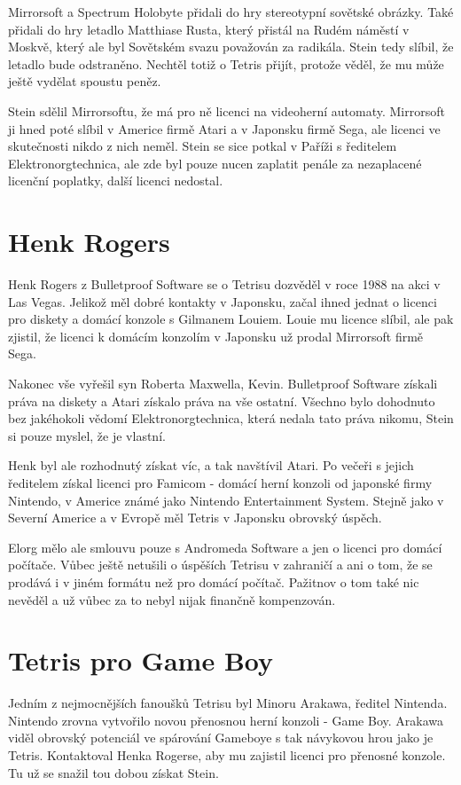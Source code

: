 \documentclass[12pt]{report}			%
\begin{document}
Mirrorsoft a Spectrum Holobyte přidali do hry stereotypní sovětské obrázky. Také přidali do hry letadlo Matthiase Rusta, který přistál na Rudém náměstí v Moskvě, který ale byl  Sovětském svazu považován za radikála. Stein tedy slíbil, že letadlo bude odstraněno. Nechtěl totiž o Tetris přijít, protože věděl, že mu může ještě vydělat spoustu peněz. \cite{Brown2016}

Stein sdělil Mirrorsoftu, že má pro ně licenci na videoherní automaty. Mirrorsoft ji hned poté slíbil v Americe firmě Atari a v Japonsku firmě Sega, ale licenci ve skutečnosti nikdo z nich neměl. Stein se sice potkal v Paříži s ředitelem Elektronorgtechnica, ale zde byl pouze nucen zaplatit penále za nezaplacené licenční poplatky, další licenci nedostal. \cite{Brown2016}\\
			
		\chapter{Henk Rogers}
Henk Rogers z Bulletproof Software se o Tetrisu dozvěděl v roce 1988 na akci v Las Vegas. Jelikož měl dobré kontakty v Japonsku, začal ihned jednat o licenci pro diskety a domácí konzole s Gilmanem Louiem. Louie mu licence slíbil, ale pak zjistil, že licenci k domácím konzolím v Japonsku už prodal Mirrorsoft firmě Sega.\cite{Brown2016}

Nakonec vše vyřešil syn Roberta Maxwella, Kevin. Bulletproof Software získali práva na diskety a Atari získalo práva na vše ostatní. Všechno bylo dohodnuto bez jakéhokoli vědomí Elektronorgtechnica, která nedala tato práva nikomu, Stein si pouze myslel, že je vlastní.\cite{Brown2016}

Henk byl ale rozhodnutý získat víc, a tak navštívil Atari. Po večeři s jejich ředitelem získal licenci pro Famicom - domácí herní konzoli od japonské firmy Nintendo, v Americe známé jako Nintendo Entertainment System. Stejně jako v Severní Americe a v Evropě měl Tetris v Japonsku obrovský úspěch. \cite{Brown2016}

Elorg mělo ale smlouvu pouze s Andromeda Software a jen o licenci pro domácí počítače. Vůbec ještě netušili o úspěších Tetrisu v zahraničí a ani o tom, že se prodává i v jiném formátu než pro domácí počítač. Pažitnov o tom také nic nevěděl a už vůbec za to nebyl nijak finančně kompenzován. \cite{Brown2016}\\
			
		\chapter{Tetris pro Game Boy}
Jedním z nejmocnějších fanoušků Tetrisu byl Minoru Arakawa, ředitel Nintenda. Nintendo zrovna vytvořilo novou přenosnou herní konzoli - Game Boy. Arakawa viděl obrovský potenciál ve spárování Gameboye s tak návykovou hrou jako je Tetris. Kontaktoval Henka Rogerse, aby mu zajistil licenci pro přenosné konzole. Tu už se snažil tou dobou získat Stein.\cite{Brown2016}
\end{document}
